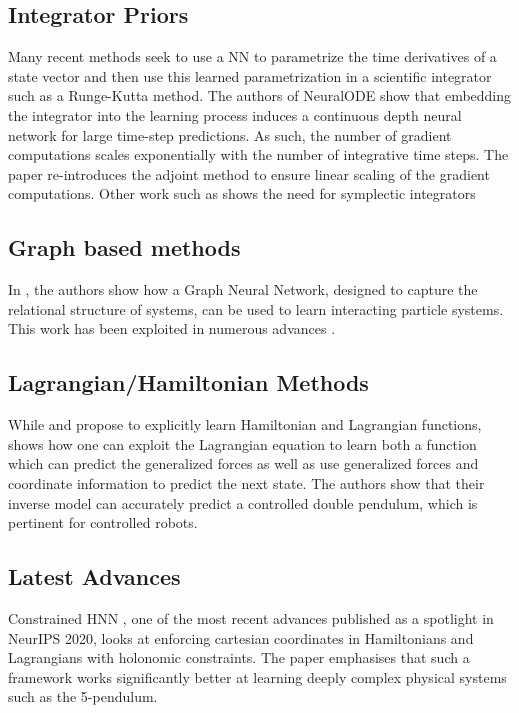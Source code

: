 \documentclass[twoside]{article}
\begin{document}
\subsection*{Integrator Priors}
Many recent methods seek to use a NN to parametrize the time derivatives of a state vector and then use this learned parametrization in a scientific integrator such as a Runge-Kutta method. The authors of NeuralODE \cite{chen_neural_2018} show that embedding the integrator into the learning process induces a continuous depth neural network for large time-step predictions. As such, the number of gradient computations scales exponentially with the number of integrative time steps. The paper re-introduces the adjoint method to ensure linear scaling of the gradient computations. Other work such as \cite{zhu_deep_2020} shows the need for symplectic integrators 

\subsection*{Graph based methods}
In \cite{battaglia_interaction_2016}, the authors show how a Graph Neural Network, designed to capture the relational structure of systems, can be used to learn interacting particle systems. This work has been exploited in numerous advances \cite{sanchez-gonzalez_graph_2018,sanchez-gonzalez_learning_2020,cranmer_lagrangian_2020}.

\subsection*{Lagrangian/Hamiltonian Methods}
While \cite{cranmer_lagrangian_2020} and \cite{greydanus_hamiltonian_2019} propose to explicitly learn Hamiltonian and Lagrangian functions, \cite{lutter_deep_2019} shows how one can exploit the Lagrangian equation to learn both a function which can predict the generalized forces as well as use generalized forces and coordinate information to predict the next state. The authors show that their inverse model can accurately predict a controlled double pendulum, which is pertinent for controlled robots.


\subsection*{Latest Advances}
Constrained HNN \cite{finzi_generalizing_2020}, one of the most recent advances published as a spotlight in NeurIPS 2020, looks at enforcing cartesian coordinates in Hamiltonians and Lagrangians with holonomic constraints. The paper emphasises that such a framework works significantly better at learning deeply complex physical systems such as the 5-pendulum. 
\end{document}
